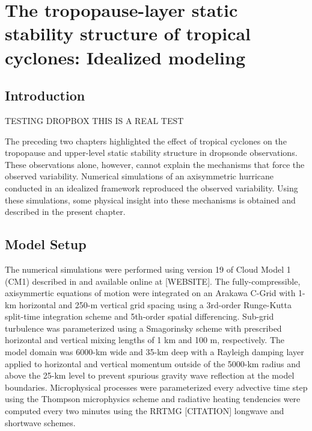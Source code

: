  
\chapter{The tropopause-layer static stability structure of tropical cyclones: Idealized modeling}
\resetfootnote %

\section{Introduction}

TESTING DROPBOX
THIS IS A REAL TEST

The preceding two chapters highlighted the effect of tropical cyclones on the tropopause and upper-level static stability structure in dropsonde observations.
These observations alone, however, cannot explain the mechanisms that force the observed variability.
Numerical simulations of an axisymmetric hurricane conducted in an idealized framework reproduced the observed variability.
Using these simulations, some physical insight into these mechanisms is obtained and described in the present chapter.

\section{Model Setup}

The numerical simulations were performed using version 19 of Cloud Model 1 (CM1) described in \cite{BryanRotunno} and available online at [WEBSITE].
The fully-compressible, axisymmertic equations of motion were integrated on an Arakawa C-Grid with 1-km horizontal and 250-m vertical grid spacing using a 3rd-order Runge-Kutta split-time integration scheme and 5th-order spatial differencing.
Sub-grid turbulence was parameterized using a Smagorinsky scheme with prescribed horizontal and vertical mixing lengths of 1 km and 100 m, respectively.
The model domain was 6000-km wide and 35-km deep with a Rayleigh damping layer applied to horizontal and vertical momentum outside of the 5000-km radius and above the 25-km level to prevent spurious gravity wave reflection at the model boundaries.
Microphysical processes were parameterized every advective time step using the Thompson microphysics scheme \cite{Thompson} and radiative heating tendencies were computed every two minutes using the RRTMG [CITATION] longwave and shortwave schemes. 
 
